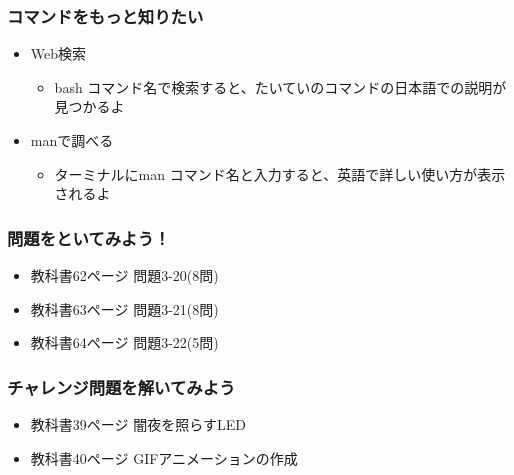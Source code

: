 \begin{frame}
    \frametitle{コマンドをもっと知りたい}
    \begin{itemize}
        \item Web検索
        \begin{itemize}
            \item bash コマンド名で検索すると、たいていのコマンドの日本語での説明が見つかるよ
        \end{itemize}
        \item manで調べる
        \begin{itemize}
            \item ターミナルにman コマンド名と入力すると、英語で詳しい使い方が表示されるよ
        \end{itemize}
    \end{itemize}
\end{frame}

\begin{frame}
    \frametitle{問題をといてみよう！}
    \begin{itemize}
        \item 教科書62ページ 問題3-20(8問)
        \item 教科書63ページ 問題3-21(8問)
        \item 教科書64ページ 問題3-22(5問)
    \end{itemize}
\end{frame}

\begin{frame}
    \frametitle{チャレンジ問題を解いてみよう}
    \begin{itemize}
        \item 教科書39ページ 闇夜を照らすLED
        \item 教科書40ページ GIFアニメーションの作成
    \end{itemize}
\end{frame}